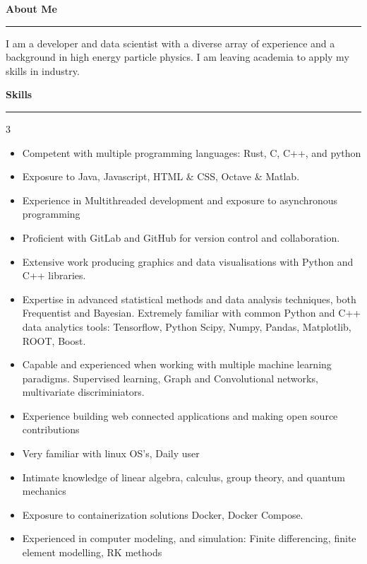 \documentclass[10pt]{article}
\begin{document}
    \begin{description}[leftmargin=6pt]
        \item \Large{\textbf{\textcolor{dt}{About Me}}\vspace{-8pt}}
        \textcolor{dt}{\rule{\textwidth-10pt}{1pt}}
        \normalsize
        I am a developer and data scientist with a diverse array of experience and a background in high energy particle physics. I am leaving academia to apply my skills in industry.
        \item \Large{\textbf{\textcolor{dt}{Skills}}\vspace{-8pt}}
        \textcolor{dt}{\rule{\textwidth-10pt}{1pt}}
        \normalsize
        \vspace{-10pt}
        \begin{multicols}{3}
            \begin{itemize}
                \setlength{\itemsep}{-1pt}
                \item Competent with multiple programming languages: Rust, C, C++, and python
                \item Exposure to Java, Javascript, HTML \& CSS, Octave \& Matlab.
                \item Experience in Multithreaded development and exposure to asynchronous programming
                \item Proficient with GitLab and GitHub for version control and collaboration.
                \item Extensive work producing graphics and data visualisations with Python and C++ libraries.
                \item Expertise in advanced statistical methods and data analysis techniques, both Frequentist and Bayesian. Extremely familiar with common Python and C++ data analytics tools:  Tensorflow, Python Scipy, Numpy, Pandas, Matplotlib, ROOT, Boost. 
                \item Capable and experienced when working with multiple machine learning paradigms. Supervised learning, Graph and Convolutional networks, multivariate discriminiators.
                \item Experience building web connected applications and making open source contributions
                \item Very familiar with linux OS's, Daily user
                \item Intimate knowledge of linear algebra, calculus, group theory, and quantum mechanics
                \item Exposure to containerization solutions Docker, Docker Compose.
                \item Experienced in computer modeling, and simulation: Finite differencing, finite element modelling, RK methods
            \end{itemize}
        \end{multicols}
        \vspace{-2pt}
    \end{description}
\end{document}
